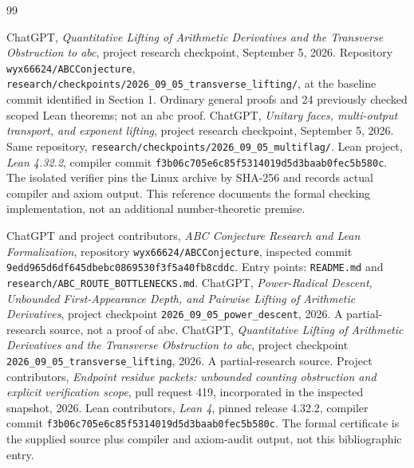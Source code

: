 \documentclass[11pt]{amsart}
\theoremstyle{definition}
\theoremstyle{remark}
\newcommand{\N}{\mathbb N}
\newcommand{\R}{\mathbb R}
\newcommand{\Z}{\mathbb Z}
\newcommand{\rad}{\operatorname{rad}}
\DeclareMathOperator{\ord}{ord}
\begin{document}
\begin{thebibliography}{99}
\endgroup
\begingroup
\let\rad\relax
\newcommand{\rad}{\operatorname{rad}}
\let\ord\relax
\newcommand{\ord}{\operatorname{ord}}
\let\lcm\relax
\newcommand{\lcm}{\operatorname{lcm}}
\let\Z\relax
\newcommand{\Z}{\mathbb Z}
\let\N\relax
\newcommand{\N}{\mathbb N}
\let\R\relax
\newcommand{\R}{\mathbb R}
\let\vp\relax
\newcommand{\vp}{v_p}
\let\Qm\relax
\newcommand{\Qm}{\mathcal Q_m}

ChatGPT, \emph{Quantitative Lifting of Arithmetic Derivatives and the
Transverse Obstruction to abc}, project research checkpoint, September 5,
2026. Repository \texttt{wyx66624/ABCConjecture},
\texttt{research/checkpoints/2026\_09\_05\_transverse\_lifting/}, at the
baseline commit identified in Section 1. Ordinary general proofs and
24 previously checked scoped Lean theorems; not an abc proof.
ChatGPT, \emph{Unitary faces, multi-output transport, and exponent lifting},
project research checkpoint, September 5, 2026. Same repository,
\texttt{research/checkpoints/2026\_09\_05\_multiflag/}.
Lean project, \emph{Lean 4.32.2}, compiler commit
\texttt{f3b06c705e6c85f5314019d5d3baab0fec5b580c}.
The isolated verifier pins the Linux archive by SHA-256 and records actual
compiler and axiom output. This reference documents the formal checking
implementation, not an additional number-theoretic premise.

\endgroup
\begingroup
\let\rad\relax
\newcommand{\rad}{\operatorname{rad}}
\let\ZZ\relax
\newcommand{\ZZ}{\mathbb Z}
\let\QQ\relax
\newcommand{\QQ}{\mathbb Q}
\let\NN\relax
\newcommand{\NN}{\mathbb N}
\let\gcdabs\relax
\newcommand{\gcdabs}[2]{\gcd\!\left(|#1|,|#2|\right)}

 ChatGPT and project contributors, \emph{ABC Conjecture Research and Lean Formalization}, repository \texttt{wyx66624/ABCConjecture}, inspected commit \texttt{9edd965d6df645dbebc0869530f3f5a40fb8cddc}. Entry points: \texttt{README.md} and \texttt{research/ABC\_ROUTE\_BOTTLENECKS.md}.
 ChatGPT, \emph{Power-Radical Descent, Unbounded First-Appearance Depth, and Pairwise Lifting of Arithmetic Derivatives}, project checkpoint \texttt{2026\_09\_05\_power\_descent}, 2026. A partial-research source, not a proof of abc.
 ChatGPT, \emph{Quantitative Lifting of Arithmetic Derivatives and the Transverse Obstruction to abc}, project checkpoint \texttt{2026\_09\_05\_transverse\_lifting}, 2026. A partial-research source.
 Project contributors, \emph{Endpoint residue packets: unbounded counting obstruction and explicit verification scope}, pull request 419, incorporated in the inspected snapshot, 2026.
 Lean contributors, \emph{Lean 4}, pinned release 4.32.2, compiler commit \texttt{f3b06c705e6c85f5314019d5d3baab0fec5b580c}. The formal certificate is the supplied source plus compiler and axiom-audit output, not this bibliographic entry.


\end{thebibliography}
\end{document}
